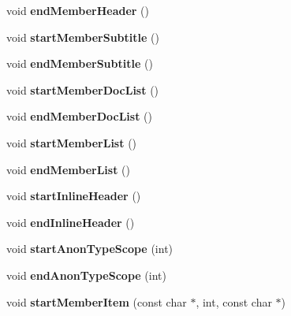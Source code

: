 \begin{DoxyCompactItemize}
void {\bfseries end\+Member\+Header} ()
\item 
\mbox{\label{class_docbook_generator_accccd27de78cff523391c7a43ca3c7e8}} 
void {\bfseries start\+Member\+Subtitle} ()
\item 
\mbox{\label{class_docbook_generator_a6b1fd9a897f23f264ef17256c44b0bc2}} 
void {\bfseries end\+Member\+Subtitle} ()
\item 
\mbox{\label{class_docbook_generator_ac5af06500d6da1e1f68ab4cb1634140e}} 
void {\bfseries start\+Member\+Doc\+List} ()
\item 
\mbox{\label{class_docbook_generator_a3b0455657c4009e49af4e003019d5edc}} 
void {\bfseries end\+Member\+Doc\+List} ()
\item 
\mbox{\label{class_docbook_generator_ad341d2ccdf7130f3a08b5d2a963cf111}} 
void {\bfseries start\+Member\+List} ()
\item 
\mbox{\label{class_docbook_generator_aa16fe3c2eaf5e95ecffc0c65f682fd71}} 
void {\bfseries end\+Member\+List} ()
\item 
\mbox{\label{class_docbook_generator_aebf3161a35b83e00b87e830a7518005e}} 
void {\bfseries start\+Inline\+Header} ()
\item 
\mbox{\label{class_docbook_generator_a9e2548f9784b8fccc4b4236f7207279e}} 
void {\bfseries end\+Inline\+Header} ()
\item 
\mbox{\label{class_docbook_generator_a7979b98c06d0d3d7450d37ca71023246}} 
void {\bfseries start\+Anon\+Type\+Scope} (int)
\item 
\mbox{\label{class_docbook_generator_adb7845f3c6ea3b95149c0e6919d3e41f}} 
void {\bfseries end\+Anon\+Type\+Scope} (int)
\item 
\mbox{\label{class_docbook_generator_a7574ab5fa838022782c7ebe20a44423a}} 
void {\bfseries start\+Member\+Item} (const char $\ast$, int, const char $\ast$)

\end{DoxyCompactItemize}
